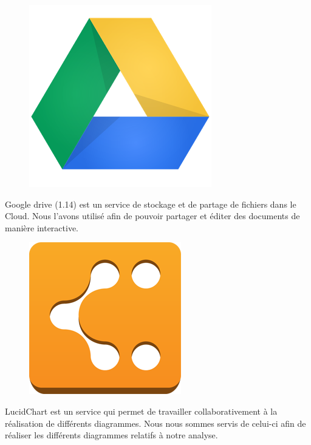 \documentclass[17pts]{report}
\begin{document}
\begin{figure}[H]
    \includegraphics[scale=0.15]{illustrations/GoogleDrive.png}
    \centering
\end{figure}

Google drive (1.14) est un service de stockage et de partage de fichiers dans
le Cloud. Nous l'avons utilisé afin de pouvoir partager et éditer des documents
de manière interactive.\\

\begin{figure}[H]
    \includegraphics[scale=0.15]{illustrations/lucidchart.png}
    \centering
\end{figure}

LucidChart est un service qui permet de travailler collaborativement à la
réalisation de différents diagrammes. Nous nous sommes servis de celui-ci afin
de réaliser les différents diagrammes relatifs à notre analyse.\\
\end{document}
